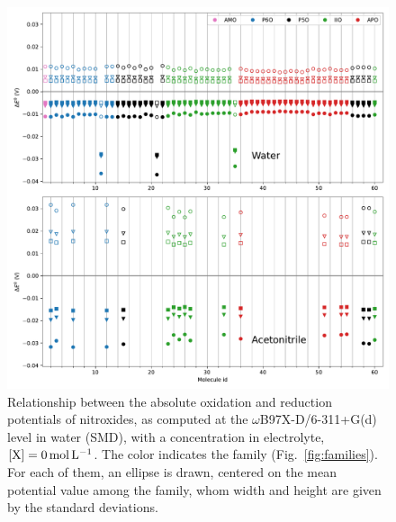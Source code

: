 \documentclass[review,preprint]{elsarticle}
\begin{document}
\begin{figure}[!h]
	\centering
	\includegraphics[width=.9\linewidth]{Figure8}
	\caption{Relationship between the absolute oxidation and reduction potentials of nitroxides, as computed at the $\omega$B97X-D/6-311+G(d) level in water (SMD), with a concentration in electrolyte, $[\ce{X}]=\SI{0}{\mole\per\liter}$. The color indicates the family (Fig.~\ref{fig:families}). For each of them, an ellipse is drawn, centered on the mean potential value among the family, whom width and height are given by the standard deviations.}
	\label{fig:family}
\end{figure}
\end{document}
